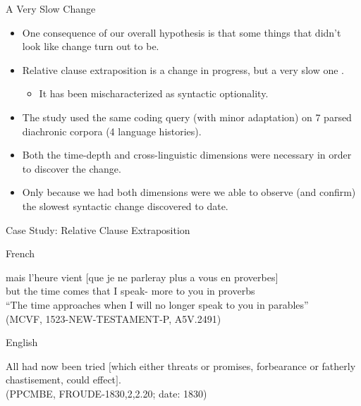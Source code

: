 \documentclass[hyperref={pdfpagelabels=false}]{beamer}
\begin{document}
\begin{frame}{A Very Slow Change}
\begin{itemize}
    \item One consequence of our overall hypothesis is that some things that didn't look like change turn out to be.
    \item Relative clause extraposition is a change in progress, but a very slow one \small{\citep[][]{wallenbergunderrev, wallenberg2013b, fruehwaldwallenberginprep}}.
        \begin{itemize}
        \item It has been mischaracterized as syntactic optionality.
        \end{itemize}
    \item The study used the same coding query (with minor adaptation) on 7 parsed diachronic corpora (4 language histories).
    \item Both the time-depth and cross-linguistic dimensions were necessary in order to discover the change.
    \item Only because we had both dimensions were we able to observe (and confirm) the slowest syntactic change discovered to date.
    \end{itemize}
\end{frame}

\begin{frame}{Case Study: Relative Clause Extraposition}

	\begin{block}{French}
		\begin{exe}
			\ex \gll mais l'heure vient $[$que je ne parleray plus a vous en proverbes$]$\\
			but {the time} comes { }that I  speak- more to you in proverbs\\
			\quad ``The time approaches when I will no longer speak to you in parables''\\
			(MCVF, 1523-NEW-TESTAMENT-P, A5V.2491)
		\end{exe}
	\end{block}
	
	\begin{block}{English}
		\begin{exe}
			\ex All had now been tried $[$which either threats or promises, forbearance or
fatherly chastisement, could effect$]$.\\
			(PPCMBE, FROUDE-1830,2,2.20; date: 1830)
		\end{exe}
	\end{block}


\end{frame}
\end{document}
